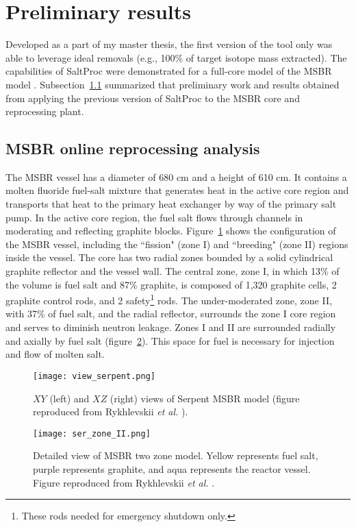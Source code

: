 \section{Preliminary results}\label{sec:pre-results-msbr}
Developed as a part of my master thesis, the first version of the tool only 
was able to leverage ideal removals (e.g., 100\% of target isotope mass 
extracted). The capabilities of SaltProc were demonstrated for a full-core 
model of the \gls{MSBR} model \cite{rykhlevskii_full-core_2017, 
rykhlevskii_modeling_2019}.
Subsection~\ref{sec:msbr_reproc} summarized that preliminary work and results 
obtained from applying the previous version of SaltProc to the \gls{MSBR} core 
and reprocessing plant.

\subsection{MSBR online reprocessing analysis} \label{sec:msbr_reproc}
The \gls{MSBR} vessel has a diameter of 680 cm and a height of 610 cm. It 
contains a molten fluoride fuel-salt mixture that generates heat in the active 
core region and transports that heat to the primary heat exchanger by way of 
the primary salt pump. In the active core region, the fuel salt flows through 
channels in moderating and reflecting graphite blocks.  
Figure~\ref{fig:serpent_plan_view} shows the configuration of the 
\gls{MSBR} vessel, including the ``fission" (zone I) and ``breeding" 
(zone II) regions inside the vessel. The core has two radial zones bounded by 
a solid cylindrical graphite reflector and the vessel wall. The central zone, 
zone I, in which 13\% of the volume is fuel salt and 87\% graphite, is
composed of 1,320 graphite cells, 2 graphite control rods, and 2 
safety\footnote{ These rods needed for emergency shutdown only.} rods. The 
under-moderated zone, zone II, with 37\% of fuel salt, and the radial 
reflector, surrounds the zone I core region and serves to diminish neutron 
leakage. Zones I and II are surrounded radially and axially by fuel salt 
(figure~\ref{fig:serpent_zoneII}). This space for fuel is necessary for 
injection and flow of molten salt.
\begin{figure}[ht!] %
	\centering
	\texttt{[image: view\_serpent.png]}
	\caption{$XY$ (left) and $XZ$ (right) views of Serpent \gls{MSBR} model 
		(figure reproduced from Rykhlevskii \emph{et al.} 
		\cite{rykhlevskii_full-core_2017}).}
	\label{fig:serpent_plan_view}
\end{figure}
\begin{figure}[hb!] %
	\centering
	\texttt{[image: ser\_zone\_II.png]}
	\caption{Detailed view of \gls{MSBR} two zone model. 
		Yellow represents fuel salt, purple represents graphite, and aqua 
		represents the reactor vessel. Figure reproduced from Rykhlevskii 
		\emph{et al.} \cite{rykhlevskii_full-core_2017}.}
	\label{fig:serpent_zoneII}
\end{figure}

